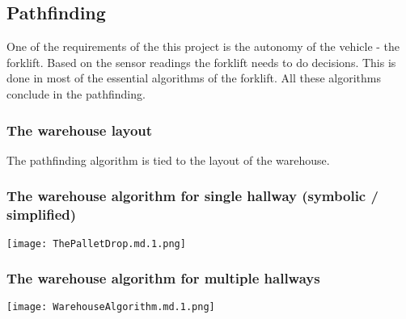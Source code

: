\documentclass[../report.tex]{subfiles}
\begin{document}
\subsection{Pathfinding}

One of the requirements of the this project is the autonomy of the vehicle - the forklift.
Based on the sensor readings the forklift needs to do decisions. This is done in most of
the essential algorithms of the forklift. All these algorithms conclude in the pathfinding.

\subsubsection{The warehouse layout}

The pathfinding algorithm is tied to the layout of the warehouse.

\subsubsection{The warehouse algorithm for single hallway (symbolic / simplified)}
\texttt{[image: ThePalletDrop.md.1.png]}
\subsubsection{The warehouse algorithm for multiple hallways}
\texttt{[image: WarehouseAlgorithm.md.1.png]}
\end{document}
